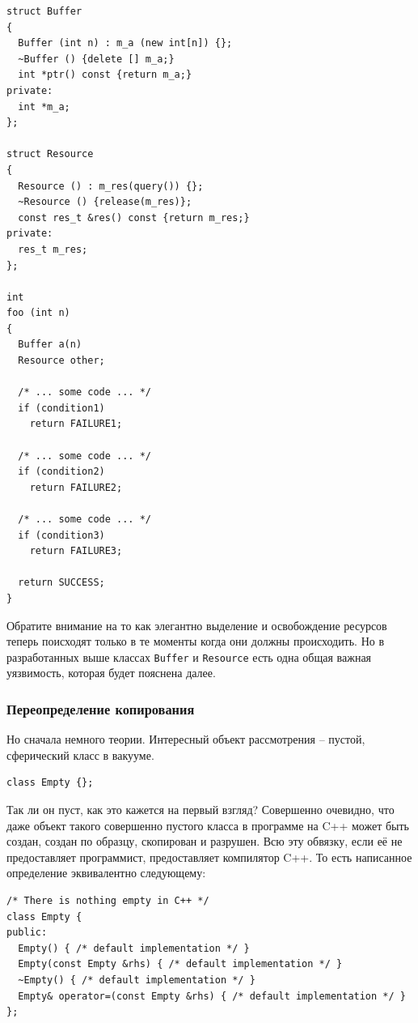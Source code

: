 \documentclass[a4paper,12pt,oneside]{article}
\begin{document}
\begin{lstlisting}
struct Buffer
{
  Buffer (int n) : m_a (new int[n]) {};
  ~Buffer () {delete [] m_a;}
  int *ptr() const {return m_a;}
private:
  int *m_a;
};

struct Resource
{
  Resource () : m_res(query()) {};
  ~Resource () {release(m_res)};
  const res_t &res() const {return m_res;}
private:
  res_t m_res;
};

int
foo (int n)
{
  Buffer a(n)
  Resource other;

  /* ... some code ... */
  if (condition1)
    return FAILURE1;

  /* ... some code ... */
  if (condition2)
    return FAILURE2;

  /* ... some code ... */
  if (condition3)
    return FAILURE3;

  return SUCCESS;
}

\end{lstlisting}

Обратите внимание на то как элегантно выделение и освобождение ресурсов теперь поисходят только в те моменты когда они должны происходить. Но в разработанных выше классах \lstinline!Buffer! и \lstinline!Resource! есть одна общая важная уязвимость, которая будет пояснена далее.

\subsubsection{Переопределение копирования}\label{CopyConstr}

Но сначала немного теории. Интересный объект рассмотрения -- пустой, сферический класс в вакууме.

\begin{lstlisting}
class Empty {};
\end{lstlisting}

Так ли он пуст, как это кажется на первый взгляд? Совершенно очевидно, что даже объект такого совершенно пустого класса в программе на C++ может быть создан, создан по образцу, скопирован и разрушен. Всю эту обвязку, если её не предоставляет программист, предоставляет компилятор C++. То есть написанное определение эквивалентно следующему:

\begin{lstlisting}
/* There is nothing empty in C++ */
class Empty {
public:
  Empty() { /* default implementation */ }
  Empty(const Empty &rhs) { /* default implementation */ }
  ~Empty() { /* default implementation */ }
  Empty& operator=(const Empty &rhs) { /* default implementation */ }
};
\end{lstlisting}
\end{document}
